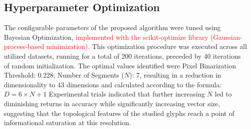 \documentclass[a4paper,fleqn]{cas-dc}
\begin{document}
\begin{table}
    \centering
    \caption{\textcolor{red}{Hyperparameters of the classifiers (identical for all datasets and DR methods; the remaining parameters take the library default values; random seed 42).}}
    \label{tab:classifier_params}
\end{table}

\subsection{Hyperparameter Optimization}

The configurable parameters of the proposed algorithm were tuned using Bayesian Optimization, \textcolor{red}{implemented with the scikit-optimize library \cite{skopt} (Gaussian-process-based minimization).} This optimization procedure was executed across all utilized datasets, running for a total of 200 iterations, preceded by 40 iterations of random initialization. The optimal values identified were Pixel Binarization Threshold: 0.228; Number of Segments ($N$): 7, resulting in a reduction in dimensionality to 43 dimensions and calculated according to the formula: $D = 6 \times N + 1$
Experimental trials indicated that further increasing $N$ led to diminishing returns in accuracy while significantly increasing  vector size, suggesting that the topological features of the studied glyphs reach a point of informational saturation at this resolution.
\end{document}
